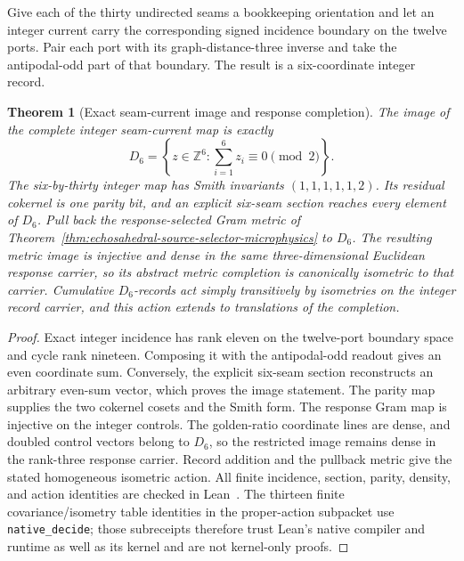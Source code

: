 \documentclass[11pt]{article}
\newtheorem{theorem}{Theorem}[section]
\theoremstyle{remark}
\theoremstyle{plain}
\begin{document}
Give each of the thirty undirected seams a bookkeeping orientation and let an
integer current carry the corresponding signed incidence boundary on the
twelve ports. Pair each port with its graph-distance-three inverse and take
the antipodal-odd part of that boundary. The result is a six-coordinate
integer record.

\begin{theorem}[Exact seam-current image and response completion]
\label{thm:seam-current-response-completion}
The image of the complete integer seam-current map is exactly
\[
D_6=\left\{z\in\mathbb Z^6:
  \sum_{i=1}^{6}z_i\equiv0\pmod 2\right\}.
\]
The six-by-thirty integer map has Smith invariants
\((1,1,1,1,1,2)\). Its residual cokernel is one parity bit, and an explicit
six-seam section reaches every element of \(D_6\). Pull back the
response-selected Gram metric of Theorem~\ref{thm:echosahedral-source-selector-microphysics}
to \(D_6\). The resulting metric image is injective and dense in the same
three-dimensional Euclidean response carrier, so its abstract metric
completion is canonically isometric to that carrier. Cumulative
\(D_6\)-records act simply transitively by isometries on the integer record
carrier, and this action extends to translations of the completion.
\end{theorem}

\begin{proof}
Exact integer incidence has rank eleven on the twelve-port boundary space and
cycle rank nineteen. Composing it with the antipodal-odd readout gives an
even coordinate sum. Conversely, the explicit six-seam section reconstructs
an arbitrary even-sum vector, which proves the image statement. The parity
map supplies the two cokernel cosets and the Smith form. The response Gram
map is injective on the integer controls. The golden-ratio coordinate lines
are dense, and doubled control vectors belong to \(D_6\), so the restricted
image remains dense in the rank-three response carrier. Record addition and
the pullback metric give the stated homogeneous isometric action. All finite
incidence, section, parity, density, and action identities are checked in
Lean~\cite{ophrepo}. The thirteen finite covariance/isometry table identities
in the proper-action subpacket use \texttt{native\_decide}; those subreceipts
therefore trust Lean's native compiler and runtime as well as its kernel and
are not kernel-only proofs.
\end{proof}
\end{document}
